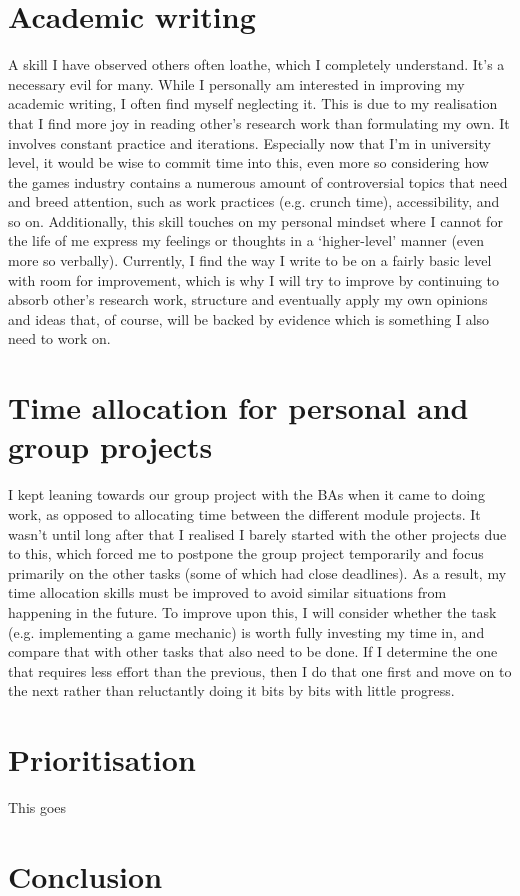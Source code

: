 \documentclass{scrartcl}
\begin{document}
\section{Academic writing}
A skill I have observed others often loathe, which I completely understand. It's a necessary evil for many. While I personally am interested in improving my academic writing, I often find myself neglecting it. This is due to my realisation that I find more joy in reading other's research work than formulating my own. It involves constant practice and iterations. Especially now that I'm in university level, it would be wise to commit time into this, even more so considering how the games industry contains a numerous amount of controversial topics that need and breed attention, such as work practices (e.g. crunch time), accessibility, and so on. Additionally, this skill touches on my personal mindset where I cannot for the life of me express my feelings or thoughts in a `higher-level' manner (even more so verbally). Currently, I find the way I write to be on a fairly basic level with room for improvement, which is why I will try to improve by continuing to absorb other's research work, structure and eventually apply my own opinions and ideas that, of course, will be backed by evidence which is something I also need to work on. 

\section{Time allocation for personal and group projects}
I kept leaning towards our group project with the BAs when it came to doing work, as opposed to allocating time between the different module projects. It wasn't until long after that I realised I barely started with the other projects due to this, which forced me to postpone the group project temporarily and focus primarily on the other tasks (some of which had close deadlines). As a result, my time allocation skills must be improved to avoid similar situations from happening in the future. To improve upon this, I will consider whether the task (e.g. implementing a game mechanic) is worth fully investing my time in, and compare that with other tasks that also need to be done. If I determine the one that requires less effort than the previous, then I do that one first and move on to the next rather than reluctantly doing it bits by bits with little progress.  

\section{Prioritisation}
This goes 

\section{Conclusion}
\end{document}
